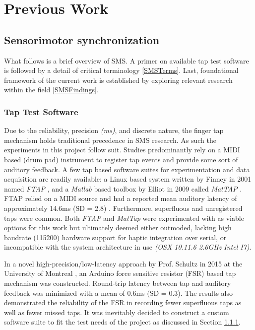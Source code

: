 \chapter{Previous Work}

\section{Sensorimotor synchronization}
What follows is a brief overview of SMS. A primer on available tap test software is followed by a detail of critical terminology \ref{SMSTerms}. Last, foundational framework of the current work is established by exploring relevant research within the field \ref{SMSFindings}.

\subsection{Tap Test Software}
Due to the reliability, precision \textit{(ms)}, and discrete nature, the finger tap mechanism holds traditional precedence in SMS research. As such the experiments in this project follow suit. Studies predominantly rely on a MIDI based (drum pad) instrument to register tap events and provide some sort of auditory feedback. A few tap based software suites for experimentation and data acquisition are readily available: a Linux based system written by Finney in 2001 named \textit{FTAP} \cite{finney2001ftap}, and a \textit{Matlab} based toolbox by Elliot in 2009 called \textit{MatTAP} \cite{elliott2009mattap}. FTAP relied on a MIDI source and had a reported mean auditory latency of approximately 14.6ms (SD = 2.8) \cite{schultz2016tap}. Furthermore, superfluous and unregistered taps were common.
Both \textit{FTAP} and \textit{MatTap} were experimented with as viable options for this work but ultimately deemed either outmoded, lacking high baudrate (115200) hardware support for haptic integration over serial, or incompatible with the system architecture in use \textit{(OSX 10.11.6 2.6GHz Intel I7)}.

In a novel high-precision/low-latency approach by Prof. Schultz in 2015 at the University of Montreal \cite{schultz2016tap}, an Arduino force sensitive resistor (FSR) based tap mechanism was constructed. Round-trip latency between tap and auditory feedback was minimized with a mean of 0.6ms (SD = 0.3). The results also demonstrated the reliability of the FSR in recording fewer superfluous taps as well as fewer missed taps.
It was inevitably decided to construct a custom software suite to fit the test needs of the project as discussed in Section \ref{}.

